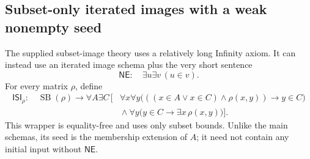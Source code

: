 \documentclass[11pt,letterpaper]{article}
\theoremstyle{definition}\newtheorem{definition}[theorem]{Definition}
\theoremstyle{remark}\newtheorem{remark}[theorem]{Remark}
\newcommand{\ISI}{\mathsf{ISI}}
\newcommand{\NE}{\mathsf{NE}}
\newcommand{\SB}{\operatorname{SB}}
\begin{document}
\subsection{Subset-only iterated images with a weak nonempty seed}

The supplied subset-image theory uses a relatively long Infinity axiom.
It can instead use an iterated image schema plus the very short sentence
\[
 \NE:\quad\exists u\exists v\,(u\in v).
\]
For every matrix $\rho$, define
\begin{equation}\label{eq:ISI}
\begin{split}
 \ISI_\rho:\quad \SB(\rho)\to\forall A\exists C\,[{}&
 \forall x\forall y\bigl(((x\in A\lor x\in C)\land\rho(x,y))
                       \to y\in C\bigr)\\
 &{}\land\forall y\bigl(y\in C\to\exists x\,\rho(x,y)\bigr)].
\end{split}
\end{equation}
This wrapper is equality-free and uses only subset bounds. Unlike the
main schemas, its seed is the membership extension of $A$; it need not
contain any initial input without $\NE$.
\end{document}
